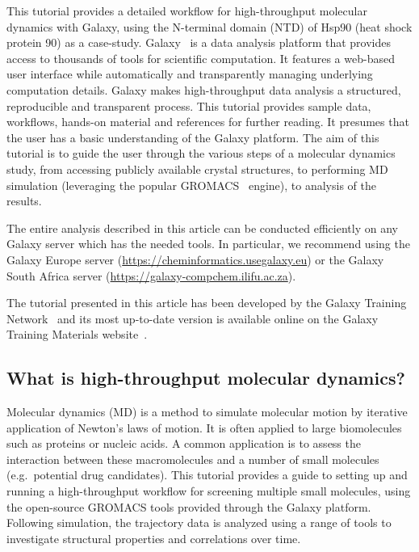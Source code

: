 \documentclass[twocolumn]{bmcart}%
\begin{document}
This tutorial provides a detailed workflow for high-throughput molecular dynamics with Galaxy, using the N-terminal domain (NTD) of Hsp90 (heat shock protein 90) as a case-study. Galaxy~\cite{afgan_galaxy_2018} is a data analysis platform that provides access to thousands of tools for scientific computation. It features a web-based user interface while automatically and transparently managing underlying computation details. Galaxy makes high-throughput data analysis a structured, reproducible and transparent process. This tutorial provides sample data, workflows, hands-on material and references for further reading. It presumes that the user has a basic understanding of the Galaxy platform. The aim of this tutorial is to guide the user through the various steps of a molecular dynamics study, from accessing publicly available crystal structures, to performing MD simulation (leveraging the popular GROMACS~\cite{abraham_gromacs_2015} engine), to analysis of the results.

The entire analysis described in this article can be conducted efficiently on any Galaxy server which has the needed tools. In particular, we recommend using the Galaxy Europe server
(\url{https://cheminformatics.usegalaxy.eu}) or the Galaxy South Africa server (\url{https://galaxy-compchem.ilifu.ac.za}).

The tutorial presented in this article has been developed by the Galaxy Training Network~\cite{Batut2018} and its most up-to-date version is available online on the Galaxy Training Materials website~\cite{gtn_comp}.


\subsection*{What is high-throughput molecular
dynamics?}\label{what-is-high-throughput-molecular-dynamics}

Molecular dynamics (MD) is a method to simulate molecular motion by
iterative application of Newton's laws of motion. It is often applied to
large biomolecules such as proteins or nucleic acids. A common
application is to assess the interaction between these macromolecules
and a number of small molecules (e.g.~potential drug candidates). This
tutorial provides a guide to setting up and running a high-throughput
workflow for screening multiple small molecules, using the open-source
GROMACS tools provided through the Galaxy platform. Following simulation, the trajectory data is analyzed using a range of tools to investigate structural properties and correlations over time.
\end{document}
